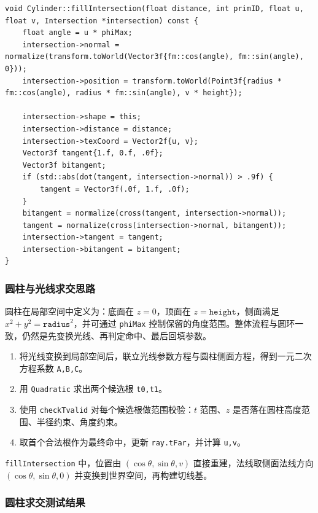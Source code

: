 \documentclass{article}
\begin{document}
\begin{lstlisting}[style=cppstyle]
void Cylinder::fillIntersection(float distance, int primID, float u, float v, Intersection *intersection) const {
    float angle = u * phiMax;
    intersection->normal = normalize(transform.toWorld(Vector3f{fm::cos(angle), fm::sin(angle), 0}));
    intersection->position = transform.toWorld(Point3f{radius * fm::cos(angle), radius * fm::sin(angle), v * height});

    intersection->shape = this;
    intersection->distance = distance;
    intersection->texCoord = Vector2f{u, v};
    Vector3f tangent{1.f, 0.f, .0f};
    Vector3f bitangent;
    if (std::abs(dot(tangent, intersection->normal)) > .9f) {
        tangent = Vector3f(.0f, 1.f, .0f);
    }
    bitangent = normalize(cross(tangent, intersection->normal));
    tangent = normalize(cross(intersection->normal, bitangent));
    intersection->tangent = tangent;
    intersection->bitangent = bitangent;
}
\end{lstlisting}

\subsubsection{圆柱与光线求交思路}

圆柱在局部空间中定义为：底面在 $z=0$，顶面在 $z=\texttt{height}$，侧面满足 $x^2+y^2=\texttt{radius}^2$，并可通过 \texttt{phiMax} 控制保留的角度范围。整体流程与圆环一致，仍然是先变换光线、再判定命中、最后回填参数。

\begin{enumerate}
    \item 将光线变换到局部空间后，联立光线参数方程与圆柱侧面方程，得到一元二次方程系数 \texttt{A,B,C}。
    \item 用 \texttt{Quadratic} 求出两个候选根 \texttt{t0,t1}。
    \item 使用 \texttt{checkTvalid} 对每个候选根做范围校验：$t$ 范围、$z$ 是否落在圆柱高度范围、半径约束、角度约束。
    \item 取首个合法根作为最终命中，更新 \texttt{ray.tFar}，并计算 \texttt{u,v}。
\end{enumerate}

\texttt{fillIntersection} 中，位置由 $(\cos\theta,\sin\theta,v)$ 直接重建，法线取侧面法线方向 $(\cos\theta,\sin\theta,0)$ 并变换到世界空间，再构建切线基。

\subsubsection{圆柱求交测试结果}
\end{document}

